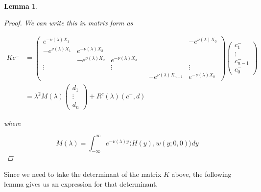 \documentclass[12pt]{article}
\newtheorem{lemma}{Lemma}
\begin{document}
\begin{lemma}
\begin{proof}
We can write this in matrix form as

\begin{align*}
K c^- &= 
\begin{pmatrix}
e^{-\nu(\lambda)X_1} & & & & & -e^{\nu(\lambda)X_0} \\
-e^{\nu(\lambda)X_1} & e^{-\nu(\lambda)X_2} \\
& -e^{\nu(\lambda)X_2} & e^{-\nu(\lambda)X_3} \\
\vdots & & \vdots & &&  \vdots \\
& & & & -e^{\nu(\lambda)X_{n-1}} & e^{-\nu(\lambda)X_0} 
\end{pmatrix}
\begin{pmatrix}
c_1^- \\ \vdots \\ c_{n-1}^- \\ c_0^-
\end{pmatrix} \\
&= \lambda^2 M(\lambda) \begin{pmatrix}
d_1 \\ \vdots \\ d_n
\end{pmatrix} + R^c(\lambda)(c^-,d)
\end{align*}

where

\[
M(\lambda) = \int_{-\infty}^\infty e^{-\nu(\lambda)y} \langle H(y), w(y; 0, 0) \rangle dy
\]

\end{proof}
\end{lemma}

Since we need to take the determinant of the matrix $K$ above, the following lemma gives us an expression for that determinant.
\end{document}
